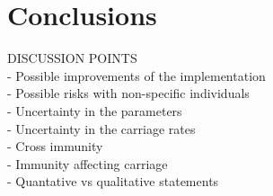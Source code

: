 \documentclass[10pt,a4paper]{article}
\begin{document}


\section{Conclusions}

DISCUSSION POINTS \\
 - Possible improvements of the implementation \\
 - Possible risks with non-specific individuals \\
 - Uncertainty in the parameters \\
 - Uncertainty in the carriage rates \\
 - Cross immunity \\
 - Immunity affecting carriage \\
 - Quantative vs qualitative statements




\newpage

\begin{appendices}


\end{appendices}



\end{document}
